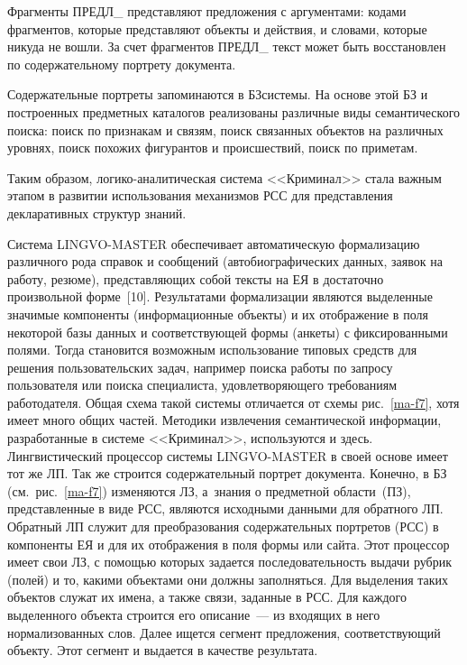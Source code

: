 \begin{multicols}{2}
 Фрагменты ПРЕДЛ\_ представляют предложения с аргументами: кодами
фрагментов, которые представляют объекты и действия, и словами, которые
никуда не вошли. За счет фрагментов ПРЕДЛ\_ текст может быть восстановлен
по содержательному портрету документа.

 Содержательные портреты запоминаются в БЗ\linebreak системы. На основе этой
БЗ и построенных предметных каталогов реализованы различные виды
семанти\-ческого поиска: поиск по признакам и связям, поиск связанных
объектов на различных уровнях, поиск похожих фигурантов и происшествий,
поиск по приметам.

 Таким образом, ло\-ги\-ко-ана\-ли\-ти\-че\-ская система <<Криминал>>
стала важным этапом в развитии использования механизмов РСС для
представления декларативных структур знаний.

 Система LINGVO-MASTER обеспечивает автоматическую
формализацию различного рода справок и сообщений (автобиографических
данных, заявок на работу, резюме), представляющих собой тексты на
ЕЯ в достаточно произвольной форме~[10]. Результатами
формализации являются выделенные значимые компоненты (информационные
объекты) и их отображение в поля некоторой базы данных и соответствующей
формы (анкеты) с фиксированными полями. Тогда становится возможным
использование типовых средств для решения пользовательских задач, например
поиска работы по запросу пользователя или поиска специалиста,
удовлетворяющего требованиям работодателя. Общая схема такой системы
отличается от схемы рис.~\ref{ma-f7}, хотя имеет много общих частей.
Методики извлечения семантической информации, разработанные в системе
<<Криминал>>, используются и здесь. Лингвистический процессор системы
LINGVO-MASTER в своей основе имеет тот же ЛП.
Так же строится содержательный портрет документа. Конечно, в БЗ
(см.\ рис.~\ref{ma-f7}) изменяются ЛЗ, а~знания о
предметной области~(ПЗ), представленные в виде РСС, являются исходными
данными для обратного ЛП. Обратный ЛП служит
для преобразования содержательных портретов (РСС) в компоненты ЕЯ и для
их отоб\-ра\-же\-ния в поля формы или сайта. Этот процессор имеет свои
ЛЗ, с помощью которых задается последовательность
выдачи руб\-рик (полей) и то, какими объектами они должны заполняться. Для
выделения таких объектов служат их имена, а также связи, заданные в РСС.
Для каждого выделенного объекта строится его описание~--- из входящих в
него нормализованных слов. Далее ищется сегмент предложения,
со\-от\-вет\-ст\-ву\-ющий объекту. Этот сегмент и выдается в качестве результата.


\end{multicols}
